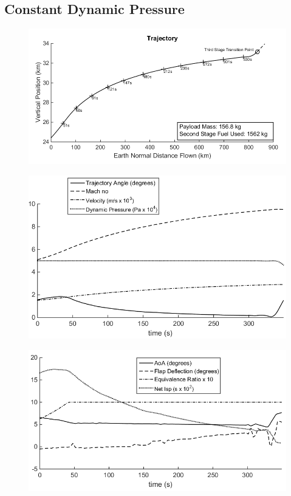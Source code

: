 \subsection{Constant Dynamic Pressure}
\begin{figure}
\centering
\includegraphics[width=0.9\linewidth]{figures/5_Ascent/Constq}
\caption{}
\label{fig:Constq}
\end{figure}
\begin{figure}
\centering
\includegraphics[width=0.8\linewidth]{figures/5_Ascent/Constq-Aero}
\caption{}
\label{fig:Constq-Aero}
\end{figure}
\begin{figure}
\centering
\includegraphics[width=0.8\linewidth]{figures/5_Ascent/Constq-Vehicle}
\caption{}
\label{fig:Constq-Vehicle}
\end{figure}

